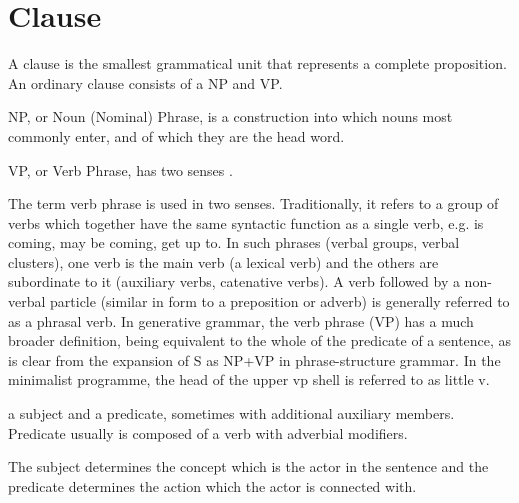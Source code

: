 \section{Clause}

A clause is the smallest grammatical unit that represents a complete proposition. An ordinary clause consists of a NP and VP.

NP, or Noun (Nominal) Phrase, is a construction into which nouns most commonly enter, and of which they are the head word. \cite{lang-dict}

VP, or Verb Phrase, has two senses \cite{lang-dict}. 

The term verb phrase is used in two senses. Traditionally, it refers to a group
of verbs which together have the same syntactic function as a single verb,
e.g. is coming, may be coming, get up to. In such phrases (verbal groups, verbal
clusters), one verb is the main verb (a lexical verb) and the others are subordinate to it (auxiliary verbs, catenative verbs). A verb followed by a non-verbal
particle (similar in form to a preposition or adverb) is generally referred to as
a phrasal verb.
In generative grammar, the verb phrase (VP) has a much broader definition,
being equivalent to the whole of the predicate of a sentence, as is clear from the
expansion of S as NP+VP in phrase-structure grammar. In the minimalist
programme, the head of the upper vp shell is referred to as little v.

a subject and a predicate, sometimes with additional auxiliary members. Predicate usually is composed of a verb with adverbial modifiers.

The subject determines the concept which is the actor in the sentence and the predicate determines the action which the actor is connected with.



